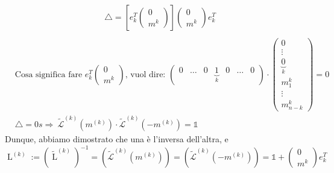 \documentclass{article}
\begin{document}
\begin{align*}
     & \triangle=\left[e^T_k\begin{pmatrix}0\\m^k\end{pmatrix}\right]\begin{pmatrix}0\\m^k\end{pmatrix}e^T_k                                                                                                    \\
\end{align*}
\begin{align*}
     & \text{Cosa significa fare }e^T_k\begin{pmatrix}0\\m^k\end{pmatrix}\text{, vuol dire: }\begin{pmatrix}0&\dots&0&\underbrace{1}_k&0&\dots&0\end{pmatrix}
    \cdot\begin{pmatrix}
             0                  \\
             \vdots             \\
             \underbrace{0}_{k} \\
             m_1^k              \\
             \vdots             \\
             m_{n-k}^k
         \end{pmatrix}=0                                                                                                                                   \\
     & \triangle=0s \Rightarrow\ \widetilde{\mathcal{L}}^{(k)}\left(m^{(k)}\right)\cdot \widetilde{\mathcal{L}}^{(k)}\left(-m^{(k)}\right)=\mathbb 1
\end{align*}
Dunque, abbiamo dimostrato che una è l'inversa dell'altra, e
\[\operatorname{L}^{(k)}:=\left(\widetilde{\operatorname{L}}^{(k)}\right)^{-1}=\left(\widetilde{\mathcal{L}}^{(k)}\left(m^{(k)}\right)\right)=\left(\widetilde{\mathcal{L}}^{(k)}\left(-m^{(k)}\right)\right)=\mathbb 1+\begin{pmatrix}
        0 \\
        m^k
    \end{pmatrix}e^T_k\]
\end{document}
